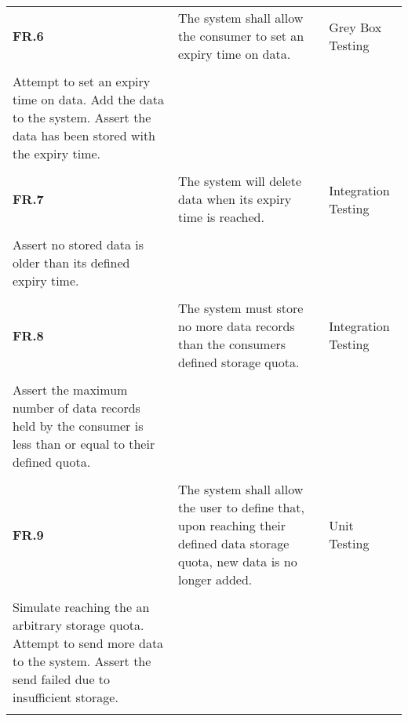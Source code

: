 \begin{table}
\begin{tabular}{|l|l|l|}
        \textbf{FR.6}  & The system shall allow the consumer to set an expiry time on data.                                                                             & Grey Box Testing\\\begin{itemize}\\\item Attempt to set an expiry time on data. Add the data to the system. Assert the data has been stored with the expiry time.\\\end{itemize}                                                                                                         \\ \hline
        \textbf{FR.7}  & The system will delete data when its expiry time is reached.                                                                                   & Integration Testing\\\begin{itemize}\\\item Assert no stored data is older than its defined expiry time.\\\end{itemize}                                                                                                                                                                  \\ \hline
        \textbf{FR.8}  & The system must store no more data records than the consumers defined storage quota.                                                           & Integration Testing\\\begin{itemize}\\\item Assert the maximum number of data records held by the consumer is less than or equal to their defined quota.\\\end{itemize}                                                                                                                  \\ \hline
        \textbf{FR.9}  & The system shall allow the user to define that, upon reaching their defined data storage quota, new data is no longer added.                   & Unit Testing\\\begin{itemize}\\\item Simulate reaching the an arbitrary storage quota. Attempt to send more data to the system. Assert the send failed due to insufficient storage.\\\end{itemize}                                                                                       \\ \hline

\end{tabular}
\end{table}
